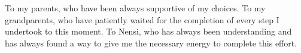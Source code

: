 \thispagestyle{empty}
{}

\vspace*{3cm}

\begin{center}
    To my parents, who have been always supportive of my choices.
    To my grandparents, who have patiently waited for the completion of every
    step I undertook to this moment.
    To Nensi, who has always been understanding and has always found a way to
    give me the necessary energy to complete this effort.
\end{center}

